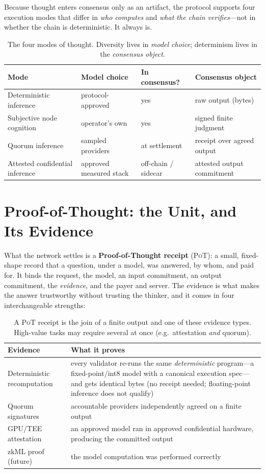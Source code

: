 \documentclass[11pt]{article}
\newcommand{\PoT}{\textsc{PoT}}
\begin{document}
Because thought enters consensus only as an artifact, the protocol supports four execution modes that differ in \emph{who computes} and \emph{what the chain verifies}---not in whether the chain is deterministic. It always is.

\begin{table}[h]
\centering\small
\begin{tabular}{@{}p{3.5cm}p{3.4cm}p{3.0cm}p{4.1cm}@{}}
\toprule
Mode & Model choice & In consensus? & Consensus object \\
\midrule
Deterministic inference & protocol-approved & yes & raw output (bytes) \\
Subjective node cognition & operator's own & yes & signed finite judgment \\
Quorum inference & sampled providers & at settlement & receipt over agreed output \\
Attested confidential inference & approved measured stack & off-chain / sidecar & attested output commitment \\
\bottomrule
\end{tabular}
\caption{The four modes of thought. Diversity lives in \emph{model choice}; determinism lives in the \emph{consensus object}.}
\label{tab:modes}
\end{table}

\section{Proof-of-Thought: the Unit, and Its Evidence}

What the network settles is a \textbf{Proof-of-Thought receipt} (\PoT{}): a small, fixed-shape record that a question, under a model, was answered, by whom, and paid for. It binds the request, the model, an input commitment, an output commitment, the \emph{evidence}, and the payer and server. The evidence is what makes the answer trustworthy without trusting the thinker, and it comes in four interchangeable strengths:

\begin{table}[h]
\centering\small
\begin{tabular}{@{}p{4.6cm}p{9.4cm}@{}}
\toprule
Evidence & What it proves \\
\midrule
Deterministic recomputation & every validator re-runs the same \emph{deterministic} program---a fixed-point/int8 model with a canonical execution spec---and gets identical bytes (no receipt needed; floating-point inference does not qualify) \\
Quorum signatures & accountable providers independently agreed on a finite output \\
GPU/TEE attestation & an approved model ran in approved confidential hardware, producing the committed output \\
zkML proof (future) & the model computation was performed correctly \\
\bottomrule
\end{tabular}
\caption{A \PoT{} receipt is the join of a finite output and one of these evidence types. High-value tasks may require several at once (e.g.\ attestation \emph{and} quorum).}
\label{tab:evidence}
\end{table}
\end{document}
